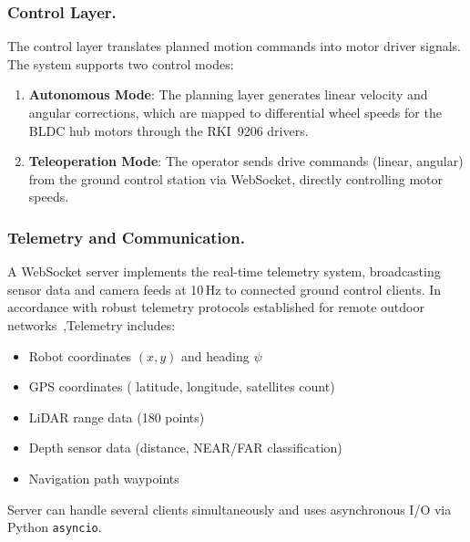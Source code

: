 \documentclass[runningheads]{llncs}
\begin{document}
\subsubsection{Control Layer.}

The control layer translates planned motion commands into motor driver signals. The system supports two control modes:

\begin{enumerate}\setlength{\itemsep}{0.2ex}\parskip0pt
    \item \textbf{Autonomous Mode}: The planning layer generates linear velocity and angular corrections, which are mapped to differential wheel speeds for the BLDC hub motors through the RKI~9206 drivers.
    \item \textbf{Teleoperation Mode}: The operator sends drive commands (linear, angular) from the ground control station via WebSocket, directly controlling motor speeds.
\end{enumerate}

\subsubsection{Telemetry and Communication.}

A WebSocket server implements the real-time telemetry system, broadcasting sensor data and camera feeds at 10\,Hz to connected ground control clients. In accordance with robust telemetry protocols established for remote outdoor networks~\cite{fisher2025developing, memet2025adaptive},Telemetry includes:

\begin{itemize}\setlength{\itemsep}{0.2ex}\parskip0pt
    \item Robot coordinates $(x, y)$ and heading $\psi$
    \item GPS coordinates ( latitude, longitude, satellites count)
    \item LiDAR range data (180 points)
    \item Depth sensor data (distance, NEAR/FAR classification)
    \item Navigation path waypoints 
\end{itemize}

Server can handle several clients simultaneously and uses asynchronous I/O via Python \texttt{asyncio}.

\end{document}
